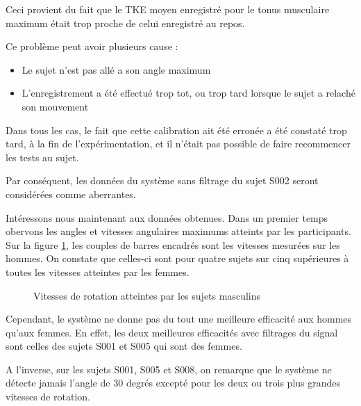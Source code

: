 \documentclass[letterpaper, twoside, 12pt, memoire, creativecommons, hyperref]{thETS}
\begin{document}
Ceci provient du fait que le TKE moyen enregistré pour le tonus musculaire maximum était trop proche de celui enregistré au repos. 

Ce problème peut avoir plusieurs cause : 

\begin{itemize}
 \item Le sujet n'est pas allé a son angle maximum
 \item L'enregistrement a été effectué trop tot, ou trop tard lorsque le sujet a relaché son mouvement
\end{itemize}

Dans tous les cas, le fait que cette calibration ait été erronée a été constaté trop tard, à la fin de l'expérimentation, et il n'était pas possible de faire recommencer les tests au sujet.

Par conséquent, les données du système sans filtrage du sujet S002 seront considérées comme aberrantes. 

Intéressons nous maintenant aux données obtenues. Dans un premier temps obervons les angles et vitesses angulaires maximums atteints par les participants. Sur la figure \ref{fig:vitesseshommes}, les couples de barres encadrés sont les vitesses mesurées sur les hommes. On constate que celles-ci sont pour quatre sujets sur cinq supérieures à toutes les vitesses atteintes par les femmes. 

\begin{figure}
	\centering
	\caption{Vitesses de rotation atteintes par les sujets masculins}
	\label{fig:vitesseshommes}
\end{figure}

Cependant, le système ne donne pas du tout une meilleure efficacité aux hommes qu'aux femmes. En effet, les deux meilleures efficacités avec filtrages du signal sont celles des sujets S001 et S005 qui sont des femmes. 

A l'inverse, sur les sujets S001, S005 et S008, on remarque que le système ne détecte jamais l'angle de 30 degrés excepté pour les deux ou trois plus grandes vitesses de rotation.  
\end{document}
